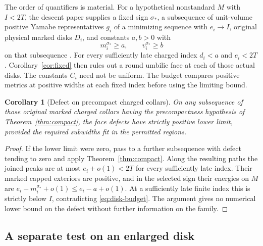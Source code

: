 \documentclass[11pt,letterpaper]{article}
\numberwithin{equation}{section}
\newtheorem{corollary}[theorem]{Corollary}
\begin{document}
The order of quantifiers is material. For a hypothetical
nonstandard \(M\) with \(I<2T\), the descent paper supplies a fixed
sign \(\sigma_*\), a subsequence of unit-volume positive Yamabe
representatives \(g_i\) of a minimizing sequence with \(e_i\to I\),
original physical marked disks
\(D_i\), and constants \(a,b>0\) with
\[
 m_i^{\sigma_*}\ge a,\qquad v_i^{\sigma_*}\ge b
\]
on that subsequence \cite[A comparison scale carrying diffuse Weyl curvature]{Baker2026FixedDescent}. For every sufficiently late charged
index \(d_i<a\) and \(e_i<2T\). Corollary~\ref{cor:fixed} then
rules out a round umbilic face at each of those actual disks.
The constants \(C_i\) need not be uniform. The budget compares
positive metrics at positive widths at each fixed index before
using the limiting bound.

\begin{corollary}[Defect on precompact charged collars]\label{cor:charged}
On any subsequence of those original marked charged collars having
the precompactness hypothesis of Theorem~\ref{thm:compact},
the face defects have strictly positive lower limit, provided the
required subwidths fit in the permitted regions.
\end{corollary}

\begin{proof}
If the lower limit were zero, pass to a further subsequence with
defect tending to zero and apply Theorem~\ref{thm:compact}. Along
the resulting paths the joined peaks are at most \(e_i+o(1)<2T\)
for every sufficiently late index. Their marked capped exteriors
are positive, and in the selected sign their energies on \(M\)
are \(e_i-m_i^{\sigma_*}+o(1)\le e_i-a+o(1)\). At a sufficiently
late finite index this is strictly below \(I\), contradicting
\eqref{eq:disk-budget}. The argument gives no numerical lower
bound on the defect without further information on the family.
\end{proof}

\subsection{A separate test on an enlarged disk}
\end{document}
